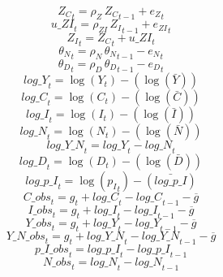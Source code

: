 \begin{dmath}
{{Z_C}}_{t}={{\rho_Z}}\, {{Z_C}}_{t-1}+{{e_Z}}_{t}
\end{dmath}
\begin{dmath}
{u\_ZI}_{t}={{\rho_{ZI}}}\, {{Z_I}}_{t-1}+{{e_{ZI}}}_{t}
\end{dmath}
\begin{dmath}
{{Z_I}}_{t}={{Z_C}}_{t}+{u\_ZI}_{t}
\end{dmath}
\begin{dmath}
{{\theta_N}}_{t}={{\rho_N}}\, {{\theta_N}}_{t-1}-{{e_N}}_{t}
\end{dmath}
\begin{dmath}
{{\theta_D}}_{t}={{\rho_D}}\, {{\theta_D}}_{t-1}-{{e_D}}_{t}
\end{dmath}
\begin{dmath}
{log\_Y}_{t}=\log\left({{Y}}_{t}\right)-(\log\left(\bar{{Y}}\right))
\end{dmath}
\begin{dmath}
{log\_C}_{t}=\log\left({{C}}_{t}\right)-(\log\left(\bar{{C}}\right))
\end{dmath}
\begin{dmath}
{log\_I}_{t}=\log\left({{I}}_{t}\right)-(\log\left(\bar{{I}}\right))
\end{dmath}
\begin{dmath}
{log\_N}_{t}=\log\left({{N}}_{t}\right)-(\log\left(\bar{{N}}\right))
\end{dmath}
\begin{dmath}
{log\_Y\_N}_{t}={log\_Y}_{t}-{log\_N}_{t}
\end{dmath}
\begin{dmath}
{log\_D}_{t}=\log\left({{D}}_{t}\right)-(\log\left(\bar{{D}}\right))
\end{dmath}
\begin{dmath}
{log\_p\_I}_{t}=\log\left({{p_I}}_{t}\right)-(\bar{log\_p\_I})
\end{dmath}
\begin{dmath}
{C\_obs}_{t}={{g}}_{t}+{log\_C}_{t}-{log\_C}_{t-1}-{{\overline{g}}}
\end{dmath}
\begin{dmath}
{I\_obs}_{t}={{g}}_{t}+{log\_I}_{t}-{log\_I}_{t-1}-{{\overline{g}}}
\end{dmath}
\begin{dmath}
{Y\_obs}_{t}={{g}}_{t}+{log\_Y}_{t}-{log\_Y}_{t-1}-{{\overline{g}}}
\end{dmath}
\begin{dmath}
{Y\_N\_obs}_{t}={{g}}_{t}+{log\_Y\_N}_{t}-{log\_Y\_N}_{t-1}-{{\overline{g}}}
\end{dmath}
\begin{dmath}
{p\_I\_obs}_{t}={log\_p\_I}_{t}-{log\_p\_I}_{t-1}
\end{dmath}
\begin{dmath}
{N\_obs}_{t}={log\_N}_{t}-{log\_N}_{t-1}
\end{dmath}
